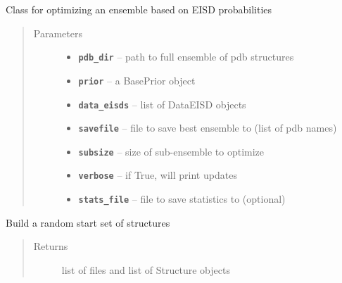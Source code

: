 \documentclass[letterpaper,10pt,english]{sphinxmanual}
\begin{document}
\begin{fulllineitems}
\label{modules:eisd.EISDOPT}
Class for optimizing an ensemble based on EISD probabilities
\begin{quote}\begin{description}
\item[{Parameters}] \leavevmode\begin{itemize}
\item {} 
\textbf{\texttt{pdb\_dir}} -- path to full ensemble of pdb structures

\item {} 
\textbf{\texttt{prior}} -- a BasePrior object

\item {} 
\textbf{\texttt{data\_eisds}} -- list of DataEISD objects

\item {} 
\textbf{\texttt{savefile}} -- file to save best ensemble to (list of pdb names)

\item {} 
\textbf{\texttt{subsize}} -- size of sub-ensemble to optimize

\item {} 
\textbf{\texttt{verbose}} -- if True, will print updates

\item {} 
\textbf{\texttt{stats\_file}} -- file to save statistics to (optional)

\end{itemize}

\end{description}\end{quote}

\begin{fulllineitems}
\label{modules:eisd.EISDOPT._build_start_set}
Build a random start set of structures
\begin{quote}\begin{description}
\item[{Returns}] \leavevmode
list of files and list of Structure objects

\end{description}\end{quote}


\end{fulllineitems}
\end{fulllineitems}
\end{document}
